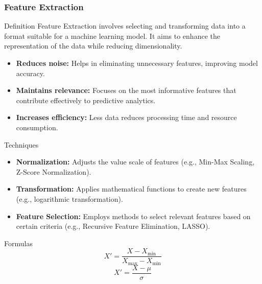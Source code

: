 \documentclass[aspectratio=169]{beamer}
\begin{document}
\begin{frame}[fragile]
    \frametitle{Feature Extraction}
    \begin{block}{Definition}
        Feature Extraction involves selecting and transforming data into a format suitable for a machine learning model. It aims to enhance the representation of the data while reducing dimensionality.
    \end{block}
    
    \begin{itemize}
        \item \textbf{Reduces noise:} Helps in eliminating unnecessary features, improving model accuracy.
        \item \textbf{Maintains relevance:} Focuses on the most informative features that contribute effectively to predictive analytics.
        \item \textbf{Increases efficiency:} Less data reduces processing time and resource consumption.
    \end{itemize}
    
    \begin{block}{Techniques}
        \begin{itemize}
            \item \textbf{Normalization:} Adjusts the value scale of features (e.g., Min-Max Scaling, Z-Score Normalization).
            \item \textbf{Transformation:} Applies mathematical functions to create new features (e.g., logarithmic transformation).
            \item \textbf{Feature Selection:} Employs methods to select relevant features based on certain criteria (e.g., Recursive Feature Elimination, LASSO).
        \end{itemize}
    \end{block}
    
    \begin{block}{Formulas}
        \begin{equation}
            X' = \frac{X - X_{\min}}{X_{\max} - X_{\min}}
        \end{equation}
        \begin{equation}
            X' = \frac{X - \mu}{\sigma}
        \end{equation}
    \end{block}
\end{frame}
\end{document}
